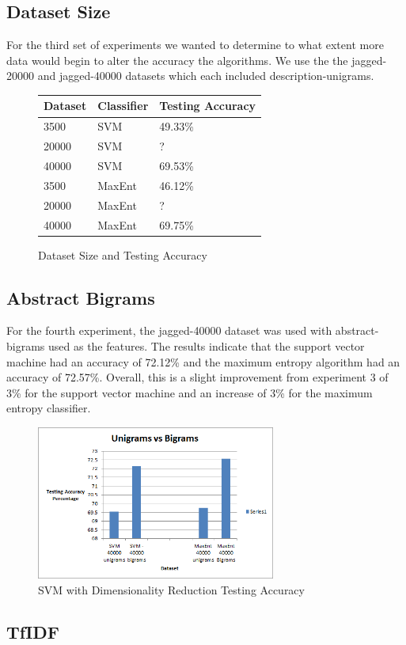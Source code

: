 \subsection{Dataset Size}
For the third set of experiments we wanted to determine to what extent more data would begin to alter the accuracy the algorithms.  We use the the jagged-20000 and jagged-40000 datasets which each included description-unigrams.

\begin{figure}[!ht]
\begin{center}
\caption{Dataset Size and Testing Accuracy}
\begin{tabular}{| l | l | l |}
\hline
Dataset & Classifier & Testing Accuracy \\ \hline
3500 & SVM & 49.33\% \\ \hline
20000 & SVM & ? \\ \hline
40000 & SVM & 69.53\% \\ \hline
3500 & MaxEnt & 46.12\% \\ \hline
20000 & MaxEnt & ? \\ \hline
40000 & MaxEnt & 69.75\% \\ \hline
\end{tabular}
\end{center}
\end{figure}

\subsection{Abstract Bigrams}
For the fourth experiment, the jagged-40000 dataset was used with abstract-bigrams used as the features.  The results indicate that the support vector machine had an accuracy of 72.12\% and the maximum entropy algorithm had an accuracy of 72.57\%.  Overall, this is a slight improvement from experiment 3 of 3\% for the support vector machine and an increase of 3\% for the maximum entropy classifier.

\begin{figure}[!h]
\begin{center}
\caption{SVM with Dimensionality Reduction Testing Accuracy}
\includegraphics[width=0.7\textwidth]{Unigrams_vs_Bigrams.png}
\end{center}
\end{figure}


\subsection{TfIDF}

